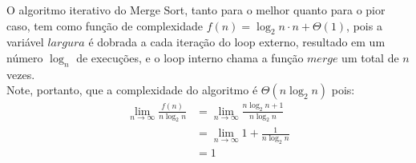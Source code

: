 O algoritmo iterativo do Merge Sort, tanto para o melhor quanto para o pior caso, tem como função de complexidade $f(n) = \log_2 n \cdot n + \Theta(1)$, pois a variável $largura$ é dobrada a cada iteração do loop externo, resultado em um número $\log_n$ de execuções, e o loop interno chama a função $merge$ um total de $n$ vezes. \\
Note, portanto, que a complexidade do algoritmo é $\Theta(n \log_2 n)$ pois:
\begin{align*}
  \lim_{n\to\infty} \frac{f(n)}{n\log_2 n} &= \lim_{n\to\infty} \frac{n \log_2 n + 1}{n\log_2 n} \\
  &= \lim_{n\to\infty} 1 + \frac{1}{n \log_2 n} \\
  &= 1
\end{align*}
